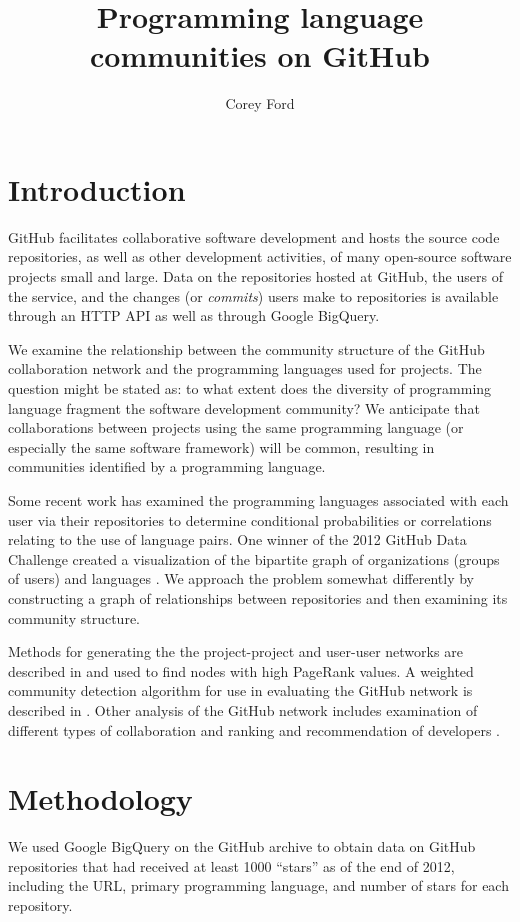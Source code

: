 \documentclass[twocolumn]{article}
\title{Programming language communities on GitHub}
\author{Corey Ford}
\begin{document}
\maketitle

\section{Introduction}

GitHub \cite{github} facilitates collaborative software development and hosts
the source code repositories, as well as other development activities, of many
open-source software projects small and large. Data on the repositories hosted
at GitHub, the users of the service, and the changes (or \textit{commits}) users
make to repositories is available through an HTTP API as well as through Google
BigQuery.

We examine the relationship between the community structure of the GitHub
collaboration network and the programming languages used for projects. The
question might be stated as: to what extent does the diversity of programming
language fragment the software development community? We anticipate that
collaborations between projects using the same programming language (or
especially the same software framework) will be common, resulting in communities
identified by a programming language.

Some recent work has examined the programming languages associated with each
user via their repositories to determine conditional probabilities \cite{doll12}
or correlations \cite{shah13} relating to the use of language pairs. One winner
of the 2012 GitHub Data Challenge created a visualization of the bipartite graph
of organizations (groups of users) and languages \cite{rodrigues12}. We approach
the problem somewhat differently by constructing a graph of relationships
between repositories and then examining its community structure.

Methods for generating the the project-project and user-user networks are
described in \cite{thung2013} and used to find nodes with high PageRank values.
A weighted community detection algorithm for use in evaluating the GitHub
network is described in \cite{marrama}. Other analysis of the GitHub network
includes examination of different types of collaboration \cite{khadke} and
ranking and recommendation of developers \cite{sarma}.

\section{Methodology}
We used Google BigQuery on the GitHub archive to obtain data on GitHub
repositories that had received at least 1000 ``stars'' as of the end of 2012,
including the URL, primary programming language, and number of stars for each
repository.
\end{document}
